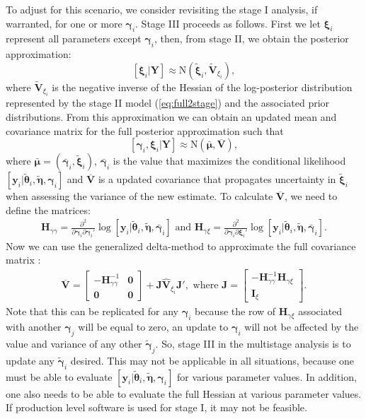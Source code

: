 \documentclass[12pt]{article}
\newcommand{\by}{\mathbf{y}}
\newcommand{\bt}{\boldsymbol{\theta}}
\newcommand{\bn}{\boldsymbol{\eta}}
\newcommand{\bg}{\boldsymbol{\gamma}}
\newcommand{\bm}{\boldsymbol{\mu}}
\newcommand{\bxi}{\boldsymbol{\xi}}
\newcommand{\bV}{\mathbf{V}}
\newcommand{\tN}{\text{N}}
\newcommand{\bY}{\mathbf{Y}}
\newcommand{\bz}{\mathbf{0}}
\begin{document}
To adjust for this scenario, we consider revisiting the stage I analysis, if warranted, for one or more $\bg_i$. Stage III proceeds as follows. First we let $\bxi_i$ represent all parameters except $\bg_i$, then, from stage II, we obtain the posterior approximation:
\[
[\bxi_i|\bY] \approx \tN(\tilde{\bxi}_i, \widetilde{\bV}_{\xi_i}),
\]  
where $\widetilde{\bV}_{\xi_i}$ is the negative inverse of the Hessian of the log-posterior distribution represented by the stage II model (\ref{eq:full2stage}) and the associated prior distributions. From this approximation we can obtain an updated mean and covariance matrix for the full posterior approximation such that
\[
[\bg_i ,\bxi_i|\bY] \approx \tN(\bar{\bm}, \overline{\bV}),
\]
where $\bar{\bm} = (\bar{\bg}_i,\tilde{\bxi}_i)$, $\bar{\bg}_i$ is the value that maximizes the conditional likelihood $[\by_i|\tilde{\bt}_i, \tilde{\bn}, \bg_i]$ and $\overline{\bV}$ is a updated covariance that propagates uncertainty in $\tilde{\bxi}_i$ when assessing the variance of the new estimate. To calculate $\overline{\bV}$, we need to define the matrices: 
\[
\begin{gathered}
\mathbf{H}_{\gamma\gamma} = \frac{\partial^2}{\partial \bg_i \partial \bg_i'} \log[\by_i|\tilde{\bt}_i, \tilde{\bn}, \bar{\bg}_i] 
\text{ and }
\mathbf{H}_{\gamma\xi} = \frac{\partial^2}{\partial \bg_i \partial \bxi_i'} \log[\by_i|\tilde{\bt}_i, \tilde{\bn}, \bar{\bg}_i].
\end{gathered}
\] 
Now we can use the generalized delta-method to approximate the full covariance matrix \citep{kass1989approximate, skaug2006automatic}:
\[
\begin{gathered}
\overline{\bV} = \left[\begin{array}{cc} -\mathbf{H}_{\gamma\gamma}^{-1} & \bz \\ \bz & \bz \end{array}\right] + 
\mathbf{J} \widehat{\bV}_{\xi_i} \mathbf{J}',  \text{ where } 
\mathbf{J} = \left[ \begin{array}{c} -\mathbf{H}_{\gamma\gamma}^{-1}\mathbf{H}_{\gamma\xi} \\ \mathbf{I}_{\xi} \end{array}\right].
\end{gathered}
\]
Note that this can be replicated for any $\bg_i$ because the row of $\mathbf{H}_{\gamma\xi}$ associated with another $\bg_j$ will be equal to zero, an update to $\bg_i$ will not be affected by the value and variance of any other $\tilde{\bg}_j$. So, stage III in the multistage analysis is to update any $\tilde{\bg}_i$ desired. This may not be applicable in all situations, because one must be able to evaluate $[\by_i|\tilde{\bt}_i, \tilde{\bn}, \bg_i]$ for various parameter values. In addition, one also needs to be able to evaluate the full Hessian at various parameter values. If production level software is used for stage I, it may not be feasible. 
\end{document}

